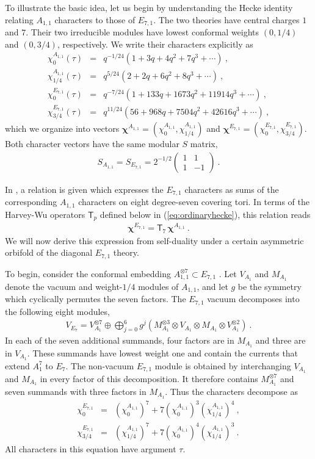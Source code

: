 \documentclass[12pt]{article}
\numberwithin{equation}{section}
\newcommand{\bea}{\begin{eqnarray}}
\newcommand{\eea}{\end{eqnarray}}
\def\no{\nonumber}
\theoremstyle{remark}
\begin{document}
To illustrate the basic idea, let us begin by understanding the Hecke identity relating $A_{1,1}$ characters to those of $E_{7,1}$. 
The two theories have central charges $1$ and $7$. Their two irreducible modules have lowest conformal weights $(0,1/4)$ and $(0,3/4)$, respectively. We write their characters explicitly as
\bea
\chi^{A_{1,1}}_0(\tau)&=&q^{-1/24}(1+3q+4q^2 + 7 q^3 + \cdots)~,\no\\
\chi^{A_{1,1}}_{1/4}(\tau)&=&q^{5/24}(2+2q+6 q^2 + 8 q^3 + \cdots)~,\no\\
\chi^{E_{7,1}}_0(\tau)&=&q^{-7/24}(1+133q+1673 q^2 + 11914 q^3 + \cdots)~,\no\\
\chi^{E_{7,1}}_{3/4}(\tau)&=&q^{11/24}(56+968 q + 7504 q^2 + 42616q^3 + \cdots)~,
\eea
which we organize into vectors $\boldsymbol{\chi}^{A_{1,1}} = (\chi^{A_{1,1}}_0, \chi^{A_{1,1}}_{1/4})$ and $\boldsymbol{\chi}^{E_{7,1}} = (\chi^{E_{7,1}}_0, \chi^{E_{7,1}}_{3/4})$. 
Both character vectors have the same modular $S$ matrix,
\bea
\label{eq:A11Smatrix}
S_{A_{1,1}} = S_{E_{7,1}}= 2^{-1/2}\left(\begin{matrix}1&1\\1&-1\end{matrix}\right)~.
 \eea

In \cite{Harvey:2018rdc}, a relation is given which expresses the $E_{7,1}$ characters as sums of the corresponding $A_{1,1}$ characters on eight degree-seven covering tori. 
In terms of the Harvey-Wu operators $\mathsf{T}_p$ defined below in (\ref{eq:ordinaryhecke}), this relation reads
\bea \label{eq:HarveyWuexample}
\boldsymbol{\chi}^{E_{7,1}} = \mathsf{T}_7\,  \boldsymbol{\chi}^{A_{1,1}}~.
\eea
We will now derive this expression from self-duality under a certain asymmetric orbifold of the diagonal $E_{7,1}$ theory.

To begin, consider the conformal embedding $A_{1,1}^{\otimes7}\subset E_{7,1}$ \cite{Schellekens:1986mb}. Let $V_{A_1}$ and $M_{A_1}$ denote the vacuum and weight-$1/4$ modules of $A_{1,1}$, and let $g$ be the symmetry which cyclically permutes the seven factors. The $E_{7,1}$ vacuum decomposes into the following eight modules,
\bea \label{eq:EsevenModuleBranching}
V_{E_7}=V_{A_1}^{\otimes7}\oplus\bigoplus_{j=0}^6 g^j\!\left(M_{A_1}^{\otimes3}\otimes V_{A_1}\otimes M_{A_1}\otimes V_{A_1}^{\otimes2}\right)~.
\eea
In each of the seven additional summands, four factors are in $M_{A_1}$ and three are in $V_{A_1}$. These summands have lowest weight one and contain the currents that extend $A_1^7$ to $E_7$. The non-vacuum $E_{7,1}$ module is obtained by interchanging $V_{A_1}$ and $M_{A_1}$ in every factor of this decomposition. It therefore contains $M_{A_1}^{\otimes7}$ and seven summands with three factors in $M_{A_1}$. Thus the characters decompose as
\bea \label{eq:EsevenBranching}
\chi^{E_{7,1}}_0&=&(\chi^{A_{1,1}}_0)^7+7(\chi^{A_{1,1}}_0)^3(\chi^{A_{1,1}}_{1/4})^4~,
\no\\
\chi^{E_{7,1}}_{3/4}&=&(\chi^{A_{1,1}}_{1/4})^7+7(\chi^{A_{1,1}}_0)^4(\chi^{A_{1,1}}_{1/4})^3~.
\eea
All characters in this equation have argument $\tau$. 
\end{document}
